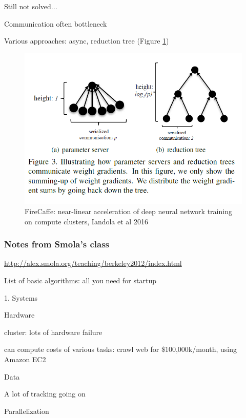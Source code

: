 \documentclass[english]{article}
\begin{document}
\item {Still not solved...}
\bitem
\item Communication often bottleneck
\item Various approaches: async, reduction tree (Figure \ref{FireCaffe})
\eitem
\begin{figure}
\begin{center}
\includegraphics[width=0.5\paperwidth]{fc}
\end{center}
\caption{FireCaffe: near-linear acceleration of deep neural network training
on compute clusters, Iandola et al 2016}
    \label{FireCaffe}
\end{figure}
\eenum

\subsubsection{Notes from Smola's class}


\url{http://alex.smola.org/teaching/berkeley2012/index.html}

List of basic algorithms: all you need for startup

\benum 
\item  1. Systems
\benum 
\item   Hardware 
       
 cluster: lots of hardware failure

 can compute costs of various tasks: crawl web for \$100,000k/month, using Amazon EC2

\item   Data
 
A lot of tracking going on

\item  Parallelization
\end{document}
